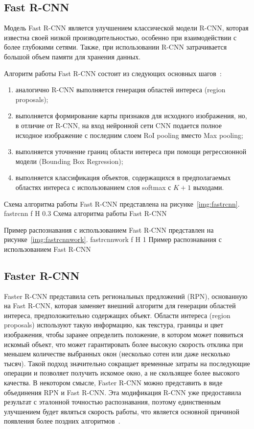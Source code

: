 \subsection{Fast R-CNN}

Модель Fast R-CNN является улучшением классической модели R-CNN, которая известна своей низкой производительностью, особенно при взаимодействии с более глубокими сетями.
Также, при использовании R-CNN затрачивается большой объем памяти для хранения данных.

Алгоритм работы Fast R-CNN состоит из следующих основных шагов~\cite{yolochina, rcnn}:
\begin{enumerate}[leftmargin=1.6\parindent]
	\item аналогично R-CNN выполняется генерация областей интереса (region proposals);
	\item выполняется формирование карты признаков для исходного изображения, но, в отличие от R-CNN, на вход нейронной сети CNN подается полное исходное изображение с последним слоем RoI pooling вместо Max pooling;
	\item выполняется уточнение границ области интереса при помощи регрессионной модели (Bounding Box Regression);
	\item выполняется классификация объектов, содержащихся в предполагаемых областях интереса с использованием слоя softmax с $K+1$ выходами.
\end{enumerate}

\clearpage
Схема алгоритма работы Fast R-CNN представлена на рисунке~\ref{img:fastrcnn}.
	{fastrcnn}
	{f}
	{H}
	{0.3\textwidth}
	{Схема алгоритма работы Fast R-CNN}

Пример распознавания с использованием Fast R-CNN представлен на рисунке~\ref{img:fastrcnnwork}.
	{fastrcnnwork}
	{f}
	{H}
	{1\textwidth}
	{Пример распознавания с использованием Fast R-CNN}

\clearpage

\subsection{Faster R-CNN}

Faster R-CNN представила сеть региональных предложений (RPN), основанную на Fast R-CNN, которая заменяет внешний алгоритм для генерации областей интереса, предположительно содержащих объект.
Области интереса (region proposals) используют такую информацию, как текстура, границы и цвет изображения, чтобы заранее определить положение, в котором может появиться искомый объект, что может гарантировать более высокую скорость отклика при меньшем количестве выбранных окон (несколько сотен или даже несколько тысяч).
Такой подход значительно сокращает временные затраты на последующие операции и позволяет получить искомое окно, а не скользящее более высокого качества.
В некотором смысле, Faster R-CNN можно представить в виде объединения RPN и Fast R-CNN.
Эта модификация R-CNN уже предоставила результат с эталонной точностью распознавания, поэтому единственным улучшением будет являться скорость работы, что является основной причиной появления более поздних алгоритмов~\cite{fasterrcnn}.

